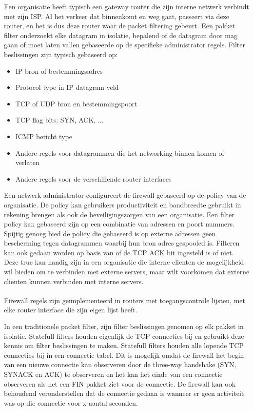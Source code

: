 Een organisatie heeft typisch een gateway router die zijn interne netwerk verbindt met zijn ISP. Al het verkeer dat binnenkomt en weg gaat, passeert via deze router, en het is dus deze router waar de packet filtering gebeurt. Een pakket filter onderzoekt elke datagram in isolatie, bepalend of de datagram door mag gaan of moet laten vallen gebaseerde op de specifieke administrator regels. Filter beslissingen zijn typisch gebaseerd op:
\begin{itemize}
\item IP bron of bestemmingsadres
\item Protocol type in IP datagram veld
\item TCP of UDP bron en bestemmingspoort
\item TCP flag bits: SYN, ACK, ...
\item ICMP bericht type
\item Andere regels voor datagrammen die het networking binnen komen of verlaten
\item Andere regels voor de verschillende router interfaces
\end{itemize}
Een netwerk administrator configureert de firewall gebaseerd op de policy van de organisatie. De policy kan gebruikers productiviteit en bandbreedte gebruikt in rekening brengen als ook de beveiligingszorgen van een organisatie. Een filter policy kan gebaseerd zijn op een combinatie van adressen en poort nummers. Spijtig genoeg bied de policy die gebaseerd is op externe adressen geen bescherming tegen datagrammen waarbij hun bron adres gespoofed is.
Filteren kan ook gedaan worden op basis van of de TCP ACK bit ingesteld is of niet. Deze truc kan handig zijn in een organisatie die interne clienten de mogelijkheid wil bieden om te verbinden met externe servers, maar wilt voorkomen dat externe clienten kunnen verbinden met interne servers.
\\\\
Firewall regels zijn geïmplementeerd in routers met toegangscontrole lijsten, met elke router interface die zijn eigen lijst heeft.


In een traditionele packet filter, zijn filter beslissingen genomen op elk pakket in isolatie. Statefull filters houden eigenlijk de TCP connecties bij en gebruikt deze kennis om filter beslissingen te maken.
Statefull filters houden alle lopende TCP connecties bij in een connectie tabel. Dit is mogelijk omdat de firewall het begin van een nieuwe connectie kan observeren door de three-way handshake (SYN, SYNACK en ACK) te observeren en het kan het einde van een connectie observeren als het een FIN pakket ziet voor de connectie. De firewall kan ook behoudend veronderstellen dat de connectie gedaan is wanneer er geen activiteit was op die connectie voor x-aantal seconden.

